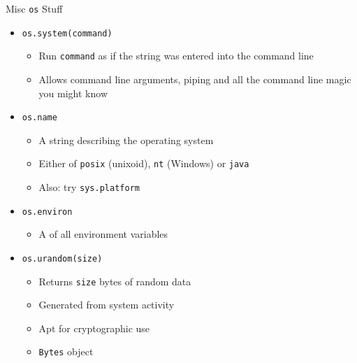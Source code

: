 \begin{frame}{Misc \texttt{os} Stuff}
%
\begin{itemize}
\item \texttt{os.system(command)}
	\begin{itemize}
	\item Run \texttt{command} as if the string was entered into the command line
	\item Allows command line arguments, piping and all the command line magic you might know
	\end{itemize}
\item \texttt{os.name}
	\begin{itemize}
	\item A string describing the operating system
	\item Either of \texttt{posix} (unixoid), \texttt{nt} (Windows) or \texttt{java}
	\item Also: try \texttt{sys.platform}
	\end{itemize}
\item \texttt{os.environ}
	\begin{itemize}
	\item A  of all environment variables
	\end{itemize}
\item \texttt{os.urandom(size)}
	\begin{itemize}
	\item Returns \texttt{size} bytes of random data
	\item Generated from system activity
	\item Apt for cryptographic use
	\item \texttt{Bytes} object
	\end{itemize}
\end{itemize}
%
\end{frame}